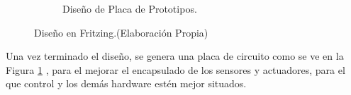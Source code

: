 \documentclass[11pt,letterpaper]{report}
\begin{document}
\begin{figure}[htp]
\begin{subfigure}[b]{0.3\textwidth}
       		    \caption{Diseño de Placa de Prototipos.}
        	   	\label{fig:dis_PP}
   				 \end{subfigure}
   			 \caption{Diseño en Fritzing.(Elaboración Propia)}\label{fig:disenio}
			\end{figure}	
					
		Una vez terminado el diseño, se genera una placa de circuito como se ve en la Figura \ref{fig:dis_PP} , para el mejorar el encapsulado de los sensores y actuadores, para el que control y los demás hardware estén mejor situados.
		
\end{document}
